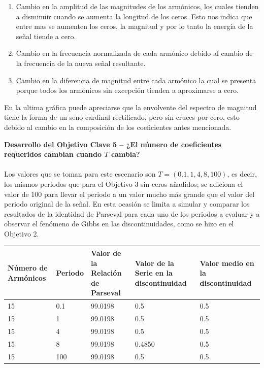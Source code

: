 \documentclass[7pt]{article}
\begin{document}
    \begin{enumerate}
        \item Cambio en la amplitud de las magnitudes de los armónicos, los cuales tienden a 
            disminuir cuando se aumenta la longitud de los ceros. Esto nos indica que entre 
            mas se aumenten los ceros, la magnitud y por lo tanto la energía de la señal tiende 
            a cero.
        \item Cambio en la frecuencia normalizada de cada armónico debido al cambio de la 
            frecuencia de la nueva señal resultante.
        \item Cambio en la diferencia de magnitud entre cada armónico la cual se presenta 
            porque todos los armónicos sin excepción tienden a aproximarse a cero.
    \end{enumerate}

    En la ultima gráfica puede apreciarse que la envolvente del espectro de magnitud tiene la 
    forma de un seno cardinal rectificado, pero sin cruces por cero, esto debido al cambio en 
    la composición de los coeficientes antes mencionada.

    \textbf{Desarrollo del Objetivo Clave 5 -- ¿El número de coeficientes requeridos cambian cuando $T$ cambia?}
    \\\\
    Los valores que se toman para este escenario son $T=(0.1,1,4,8,100)$, es decir, los mismos 
    periodos que para el Objetivo 3 sin ceros añadidos; se adiciona el valor de 100 para llevar el 
    periodo a un valor mucho más grande que el valor del periodo original de la señal. En esta 
    ocasión se limita a simular y comparar los resultados de la identidad de Parseval para cada uno de 
    los periodos a evaluar y a observar el fenómeno de Gibbs en las discontinuidades, como se hizo en 
    el Objetivo 2.

    \begin{table}[H]
        \begin{center}
            \begin{tabular}{| m{2.5cm} | m{2.5cm} | m{2.5cm} | m{2.5cm} | m{2.5cm} |}
                \hline
                \textbf{Número de Armónicos} & \textbf{Periodo} & \textbf{Valor de la Relación de Parseval} & \textbf{Valor de la Serie en la discontinuidad} & \textbf{Valor medio en la discontinuidad} \\ \hline
                15 & 0.1 & 99.0198 & 0.5 & 0.5 \\ \hline
                15 & 1 & 99.0198 & 0.5 & 0.5 \\ \hline
                15 & 4 & 99.0198 & 0.5 & 0.5 \\ \hline
                15 & 8 & 99.0198 & 0.4850 & 0.5 \\ \hline
                15 & 100 & 99.0198 & 0.5 & 0.5 \\ \hline
            \end{tabular}
        \end{center}
    \end{table}
\end{document}
